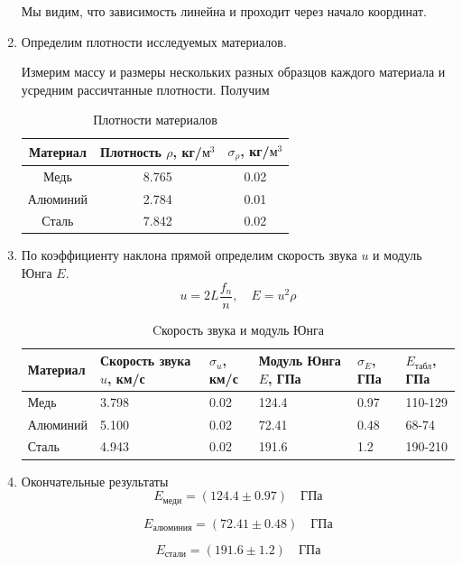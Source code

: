 \documentclass[a4paper,12 pt]{article}
\begin{document}
\begin{enumerate}
Мы видим, что зависимость линейна и проходит через начало координат.
\item Определим плотности исследуемых материалов.

Измерим массу и размеры нескольких разных образцов каждого материала и усредним рассичтанные плотности. Получим
\begin{table}[H]
    \centering
    \begin{tabular}{|c|c|c|}
        \hline
        Материал & Плотность $\rho$, кг/$\text{м}^3$ & $\sigma_{\rho}$, кг/$\text{м}^3$ \\
        \hline
        Медь & 8.765 & 0.02 \\
        \hline
        Алюминий & 2.784 & 0.01 \\
        \hline
        Сталь & 7.842 & 0.02 \\
        \hline
    \end{tabular}
    \caption{Плотности материалов}
\end{table}
\item По коэффициенту наклона прямой определим скорость звука $u$ и модуль Юнга $E$.
\begin{displaymath}
    u = 2L \frac{f_n}{n}, \quad E = u^2 \rho
\end{displaymath}
\begin{table}[H]
    \centering
    \begin{tabular}{|C{2 cm}|C{2.5 cm}|C{1 cm}|C{2.5 cm}|C{1 cm}|C{1 cm}|}
        \hline
        Материал & Скорость звука $u$, км/с & $\sigma_u$, км/с & Модуль Юнга $E$, ГПа & $\sigma_E$, ГПа & $E_{\text{табл}}$, ГПа\\
        \hline
        Медь & 3.798 & 0.02 & 124.4 & 0.97 & 110-129\\
        \hline
        Алюминий & 5.100 & 0.02 & 72.41 & 0.48 & 68-74 \\
        \hline
        Сталь & 4.943 & 0.02 & 191.6 & 1.2 & 190-210  \\
        \hline
    \end{tabular}
    \caption{Cкорость звука и модуль Юнга}
\end{table}

\item Окончательные результаты
\begin{displaymath}
    E_{\text{меди}} = (124.4 \pm 0.97) \quad \text{ГПа}
\end{displaymath}

\begin{displaymath}
    E_{\text{алюминия}} = (72.41 \pm 0.48) \quad \text{ГПа}
\end{displaymath}

\begin{displaymath}
    E_{\text{стали}} = (191.6 \pm 1.2) \quad \text{ГПа}
\end{displaymath}


\end{enumerate}
\end{document}
